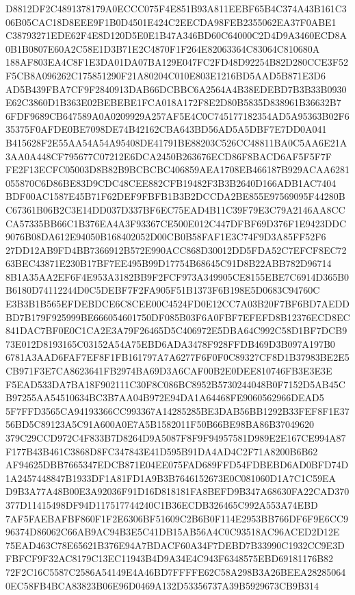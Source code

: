 \documentclass[UTF8,fontset=fandol,zihao=-4,a4paper]{ctexart}
\begin{document}
{{D8812DF2C4891378179A0ECCC075F4E851B93A811EEBF65B4C374A43B161C306B05CAC18D8EEE9F1B0D4501E424C2EECDA98FEB2355062EA37F0ABE1
C38793271EDE62F4E8D120D5E0E1B47A346BD60C64000C2D4D9A3460ECD8A0B1B0807E60A2C58E1D3B71E2C4870F1F264E82063364C83064C810680A
188AF803EA4C8F1E3DA01DA07BA129E047FC2FD48D92254B82D280CCE3F52F5CB8A096262C175851290F21A80204C010E803E1216BD5AAD5B871E3D6
AD5B439FBA7CF9F2840913DAB66DCBBC6A2564A4B38EDEBD7B3B33B0930E62C3860D1B363E02BEBEBE1FCA018A172F8E2D80B5835D838961B36632B7
6FDF9689CB647589A0A0209929A257AF5E4C0C745177182354AD5A95363B02F635375F0AFDE0BE7098DE74B42162CBA643BD56AD5A5DBF7E7DD0A041
B415628F2E55AA54A54A95408DE41791BE88203C526CC48811BA0C5AA6E21A3AA0A448CF795677C07212E6DCA2450B263676ECD86F8BACD6AF5F5F7F
FE2F13ECFC05003D8B82B9BCBCBC406859AEA1708EB466187B929ACAA6281055870C6D86BE83D9CDC48CEE882CFB19482F3B3B2640D166ADB1AC7404
BDF00AC1587E45B71F62DEF9FBFB1B3B2DCCDA2BE855E97569095F44280BC67361B06B2C3E14DD037D337BF6EC75EAD4B11C39F79E3C79A2146AA8CC
CA57335BB66C1B376EA4A3F93367CE500E012C447DFBF69D376F1E9423DDC9076B08DA612E94050B168402052D00CB0B58FAF1E3C74F9D3A85FF52F6
27DD12AB9FD4BB7366912B572E990ACC868D30012DD5FDA52C7EFCF8EC7263BEC43871E230B17BF7EE495B99D17754B68645C91D8B22ABB782D96714
8B1A35AA2EF6F4E953A3182BB9F2FCF973A349905CE8155EBE7C6914D365B0B6180D74112244D0C5DEBF7F2FA905F51B1373F6B198E5D0683C94760C
E3B3B1B565EFDEBDCE6C8CEE00C4524FD0E12CC7A03B20F7BF6BD7AEDDBD7B179F925999BE666054601750DF085B03F6A0FBF7EFEFD8B12376ECD8EC
841DAC7BF0E0C1CA2E3A79F26465D5C406972E5DBA64C992C58D1BF7DCB973E012D8193165C03152A54A75EBD6ADA3478F928FFDB469D3B097A197B0
6781A3AAD6FAF7EF8F1FB161797A7A6277F6F0F0C89327CF8D1B37983BE2E5CB971F3E7CA8623641FB2974BA69D3A6CAF00B2E0DEE810746FB3E3E3E
F5EAD533DA7BA18F902111C30F8C086BC8952B5730244048B0F7152D5AB45CB97255AA54510634BC3B7AA04B972E94DA1A64468FE9060562966DEAD5
5F7FFD3565CA94193366CC993367A14285285BE3DAB56BB1292B33FEF8F1E3756BD5C89123A5C91A600A0E7A5B1582011F50B66BE98BA86B37049620
379C29CCD972C4F833B7D8264D9A5087F8F9F94957581D989E2E167CE994A87F177B43B461C3868D8FC347843E41D595B91DA4AD4C2F71A8200B6B62
AF94625DBB7665347EDCB871E04EE075FAD689FFD54FDBEBD6AD0BFD74D1A2457448847B1933DF1A81FD1A9B3B7646152673E0C081060D1A7C1C59EA
D9B3A77A48B00E3A92036F91D16D818181FA8BEFD9B347A68630FA22CAD370377D11415498DF94D117517744240C1B36ECDB326465C992A553A74EBD
7AF5FAEBAFBF860F1F2E6306BF51609C2B6B0F114E2953BB766DF6F9E6CC996374D86062C66AB9AC94B3E5C41DB15AB56A4C0C93518AC96ACED2D12E
75EAD463C78E65621B376E94A7BDACF60A34F7DEBD7B33990C1932CC9E3DFBFCF9F32AC8179C13EC11943B4D9A34E4C943F6348575EBD69181176B82
72F2C16C5587C2586A54149E4A46BD7FFFFE62C58A298B3A26BEEA282850640EC58FB4BCA83823B06E96D0469A132D53356737A39B5929673CB9B314
}}
\end{document}
